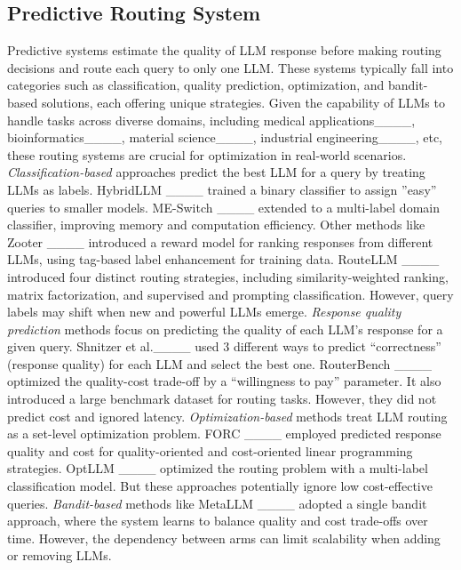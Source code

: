 \subsection{Predictive Routing System}
Predictive systems estimate the quality of LLM response before making routing decisions and route each query to only one LLM. These systems typically fall into categories such as classification, quality prediction, optimization, and bandit-based solutions, each offering unique strategies. Given the capability of LLMs to handle tasks across diverse domains, including medical applications____, bioinformatics____, material science____, industrial engineering____, etc, these routing systems are crucial for optimization in real-world scenarios.
\textit{Classification-based} approaches predict the best LLM for a query by treating LLMs as labels.
HybridLLM ____ trained a binary classifier to assign ''easy'' queries to smaller models. ME-Switch ____ extended to a multi-label domain classifier, improving memory and computation efficiency. Other methods like Zooter ____ introduced a reward model for ranking responses from different LLMs, using tag-based label enhancement for training data. RouteLLM ____ introduced four distinct routing strategies, including similarity-weighted ranking, matrix factorization, and supervised and prompting classification. However, query labels may shift when new and powerful LLMs emerge.
\textit{Response quality prediction} methods focus on predicting the quality of each LLM's response for a given query.
Shnitzer et al.____ used 3 different ways to predict ``correctness'' (response quality) for each LLM and select the best one. RouterBench ____ optimized the quality-cost trade-off by a ``willingness to pay'' parameter. It also introduced a large benchmark dataset for routing tasks. However, they did not predict cost and ignored latency. 
\textit{Optimization-based} methods treat LLM routing as a set-level optimization problem. 
FORC ____ employed predicted response quality and cost for quality-oriented and cost-oriented linear programming strategies.
OptLLM ____ optimized the routing problem with a multi-label classification model.
But these approaches potentially ignore low cost-effective queries.
\textit{Bandit-based} methods like MetaLLM ____ adopted a single bandit approach, where the system learns to balance quality and cost trade-offs over time. However, the dependency between arms can limit scalability when adding or removing LLMs.